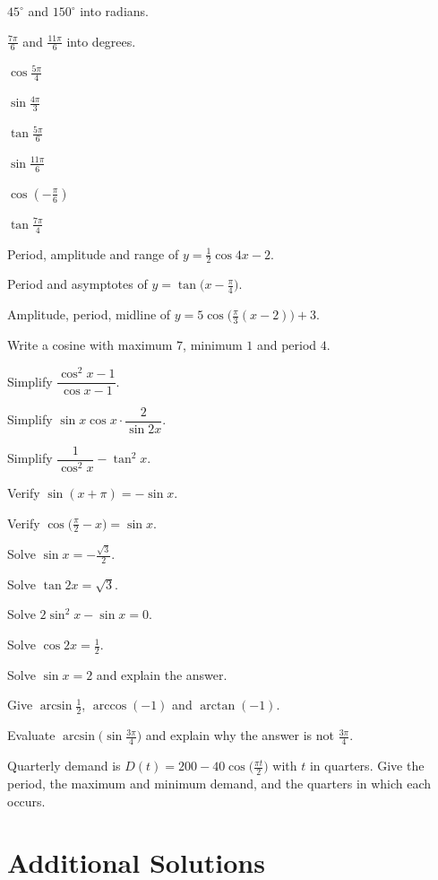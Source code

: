 \begin{problems}
  \item $45^{\circ}$ and $150^{\circ}$ into radians.
  \item $\tfrac{7\pi}{6}$ and $\tfrac{11\pi}{6}$ into degrees.
  \item $\cos\tfrac{5\pi}{4}$
  \item $\sin\tfrac{4\pi}{3}$
  \item $\tan\tfrac{5\pi}{6}$
  \item $\sin\tfrac{11\pi}{6}$
  \item $\cos(-\tfrac{\pi}{6})$
  \item $\tan\tfrac{7\pi}{4}$
  \item Period, amplitude and range of $y=\tfrac12\cos 4x-2$.
  \item Period and asymptotes of $y=\tan\bigl(x-\tfrac{\pi}{4}\bigr)$.
  \item Amplitude, period, midline of
        $y=5\cos\bigl(\tfrac{\pi}{3}(x-2)\bigr)+3$.
  \item Write a cosine with maximum $7$, minimum $1$ and period $4$.
  \item Simplify $\dfrac{\cos^{2}x-1}{\cos x-1}$.
  \item Simplify $\sin x\cos x\cdot\dfrac{2}{\sin 2x}$.
  \item Simplify $\dfrac{1}{\cos^{2}x}-\tan^{2}x$.
  \item Verify $\sin(x+\pi)=-\sin x$.
  \item Verify $\cos\bigl(\tfrac{\pi}{2}-x\bigr)=\sin x$.
  \item Solve $\sin x=-\tfrac{\sqrt3}{2}$.
  \item Solve $\tan 2x=\sqrt3$.
  \item Solve $2\sin^{2}x-\sin x=0$.
  \item Solve $\cos 2x=\tfrac12$.
  \item Solve $\sin x=2$ and explain the answer.
  \item Give $\arcsin\tfrac12$, $\arccos(-1)$ and $\arctan(-1)$.
  \item Evaluate $\arcsin\bigl(\sin\tfrac{3\pi}{4}\bigr)$ and explain why
        the answer is not $\tfrac{3\pi}{4}$.
  \item Quarterly demand is $D(t)=200-40\cos\bigl(\tfrac{\pi t}{2}\bigr)$
        with $t$ in quarters. Give the period, the maximum and minimum
        demand, and the quarters in which each occurs.
\end{problems}

\section{Additional Solutions}

